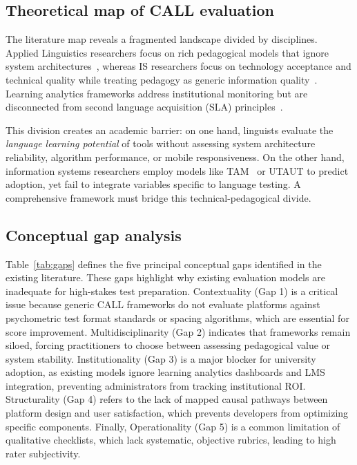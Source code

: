 \documentclass[11pt,a4paper]{article}
\begin{document}
\subsection{Theoretical map of CALL evaluation}

The literature map reveals a fragmented landscape divided by disciplines. Applied Linguistics researchers focus on rich pedagogical models that ignore system architectures~\cite{b1}\cite{b2}\cite{b3}, whereas IS researchers focus on technology acceptance and technical quality while treating pedagogy as generic information quality~\cite{b4}\cite{b5}. Learning analytics frameworks address institutional monitoring but are disconnected from second language acquisition (SLA) principles~\cite{b9}\cite{b10}. 

This division creates an academic barrier: on one hand, linguists evaluate the \textit{language learning potential} of tools without assessing system architecture reliability, algorithm performance, or mobile responsiveness. On the other hand, information systems researchers employ models like TAM~\cite{b11} or UTAUT to predict adoption, yet fail to integrate variables specific to language testing. A comprehensive framework must bridge this technical-pedagogical divide.

\subsection{Conceptual gap analysis}

Table~\ref{tab:gaps} defines the five principal conceptual gaps identified in the existing literature. These gaps highlight why existing evaluation models are inadequate for high-stakes test preparation. Contextuality (Gap 1) is a critical issue because generic CALL frameworks do not evaluate platforms against psychometric test format standards or spacing algorithms, which are essential for score improvement. Multidisciplinarity (Gap 2) indicates that frameworks remain siloed, forcing practitioners to choose between assessing pedagogical value or system stability. Institutionality (Gap 3) is a major blocker for university adoption, as existing models ignore learning analytics dashboards and LMS integration, preventing administrators from tracking institutional ROI. Structurality (Gap 4) refers to the lack of mapped causal pathways between platform design and user satisfaction, which prevents developers from optimizing specific components. Finally, Operationality (Gap 5) is a common limitation of qualitative checklists, which lack systematic, objective rubrics, leading to high rater subjectivity.
\end{document}
